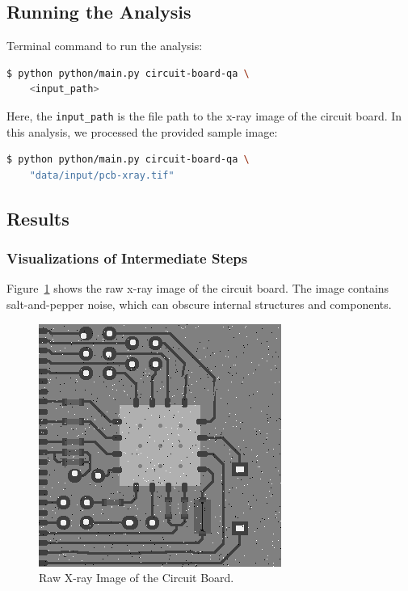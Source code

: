 \documentclass[a4paper,12pt]{article}
\begin{document}
\subsection{Running the Analysis}

Terminal command to run the analysis:

\begin{lstlisting}[language=bash]
$ python python/main.py circuit-board-qa \
    <input_path>
\end{lstlisting}

Here, the \texttt{input\_path} is the file path to the x-ray image of the circuit board. In this analysis, we processed the provided sample image:

\begin{lstlisting}[language=bash]
$ python python/main.py circuit-board-qa \
    "data/input/pcb-xray.tif"
\end{lstlisting}

\subsection{Results}

\subsubsection{Visualizations of Intermediate Steps}

Figure~\ref{fig:image_raw} shows the raw x-ray image of the circuit board. The image contains salt-and-pepper noise, which can obscure internal structures and components.

\begin{figure}[!htbp]
    \centering
    \includegraphics[width=0.5\linewidth]{data/output/circuit_board_qa/image_raw.png}
    \caption{Raw X-ray Image of the Circuit Board.}
    \label{fig:image_raw}
\end{figure}
\end{document}
